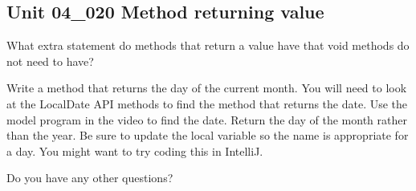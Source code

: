 \documentclass[letterpaper,12pt]{exam}
\newcommand{\unit}{Unit 04}
\begin{document}
\begin{questions}
\section*{\unit\_020 Method returning value} %
\begin{samepage}
	\question What extra statement do methods that return a value have that void methods do not need to have?
	\vspace{5mm}
\end{samepage}

\clearpage

\begin{samepage}
	\question Write a method that returns the day of the current month.  You will need to look at the LocalDate API methods to find the method that returns the date.  Use the model program in the video to find the date.  Return the day of the month rather than the year.  Be sure to update the local variable so the name is appropriate for a day.  You might want to try coding this in IntelliJ.  
	\vspace{55mm}
\end{samepage}


\begin{samepage}
	\question Do you have any other questions?
	\vspace{30mm}
\end{samepage}

\end{questions}
\end{document}
